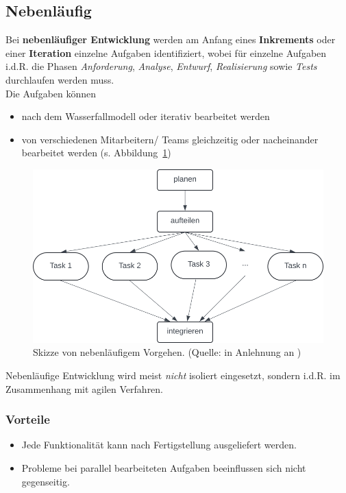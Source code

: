 \subsection{Nebenläufig}

\noindent
Bei \textbf{nebenläufiger Entwicklung} werden am Anfang eines \textbf{Inkrements} oder einer \textbf{Iteration} einzelne Aufgaben identifiziert, wobei für einzelne Aufgaben i.d.R. die Phasen \textit{Anforderung}, \textit{Analyse},  \textit{Entwurf}, \textit{Realisierung} sowie \textit{Tests} durchlaufen werden muss.\\
Die Aufgaben können
\begin{itemize}
    \item nach dem Wasserfallmodell oder iterativ bearbeitet werden
    \item von verschiedenen Mitarbeitern/ Teams gleichzeitig oder nacheinander bearbeitet werden (s. Abbildung~\ref{fig:nebenlaeufig})
\end{itemize}


\begin{figure}
    \centering
    \includegraphics[scale=0.4]{part one/Prozessmodelle/img/nebenlaeufigkeit}
    \caption{Skizze von nebenläufigem Vorgehen. (Quelle: in Anlehnung an \cite[29]{Wed09})}
    \label{fig:nebenlaeufig}
\end{figure}


\noindent
Nebenläufige Entwicklung wird meist \textit{nicht} isoliert eingesetzt, sondern i.d.R. im Zusammenhang mit agilen Verfahren.

\subsubsection*{Vorteile}

\begin{itemize}
    \item Jede Funktionalität kann nach Fertigstellung ausgeliefert werden.
    \item Probleme bei parallel bearbeiteten Aufgaben beeinflussen sich nicht gegenseitig.
\end{itemize}

